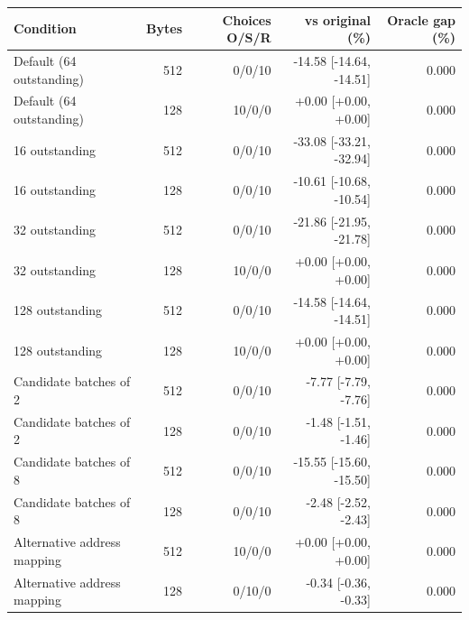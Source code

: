 \begin{tabular}{lrrrr}
\toprule
Condition & Bytes & Choices O/S/R & vs original (\%) & Oracle gap (\%) \\
\midrule
Default (64 outstanding) & 512 & 0/0/10 & -14.58 [-14.64, -14.51] & 0.000 \\
Default (64 outstanding) & 128 & 10/0/0 & +0.00 [+0.00, +0.00] & 0.000 \\
16 outstanding & 512 & 0/0/10 & -33.08 [-33.21, -32.94] & 0.000 \\
16 outstanding & 128 & 0/0/10 & -10.61 [-10.68, -10.54] & 0.000 \\
32 outstanding & 512 & 0/0/10 & -21.86 [-21.95, -21.78] & 0.000 \\
32 outstanding & 128 & 10/0/0 & +0.00 [+0.00, +0.00] & 0.000 \\
128 outstanding & 512 & 0/0/10 & -14.58 [-14.64, -14.51] & 0.000 \\
128 outstanding & 128 & 10/0/0 & +0.00 [+0.00, +0.00] & 0.000 \\
Candidate batches of 2 & 512 & 0/0/10 & -7.77 [-7.79, -7.76] & 0.000 \\
Candidate batches of 2 & 128 & 0/0/10 & -1.48 [-1.51, -1.46] & 0.000 \\
Candidate batches of 8 & 512 & 0/0/10 & -15.55 [-15.60, -15.50] & 0.000 \\
Candidate batches of 8 & 128 & 0/0/10 & -2.48 [-2.52, -2.43] & 0.000 \\
Alternative address mapping & 512 & 10/0/0 & +0.00 [+0.00, +0.00] & 0.000 \\
Alternative address mapping & 128 & 0/10/0 & -0.34 [-0.36, -0.33] & 0.000 \\
\bottomrule
\end{tabular}
